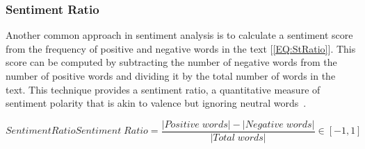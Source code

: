 \subsubsection{Sentiment Ratio}

Another common approach in sentiment analysis is to calculate a sentiment score from the frequency of positive and negative words in the text [\ref{EQ:StRatio}]. This score can be computed by subtracting the number of negative words from the number of positive words and dividing it by the total number of words in the text. This technique provides a sentiment ratio, a quantitative measure of sentiment polarity that is akin to valence but ignoring neutral words~\cite{STSC}.

\begin{equation}[EQ:StRatio]{Sentiment Ratio}
    Sentiment\;Ratio = \frac{|Positive\;words| - |Negative\;words|}{|Total\;words|} \in [-1, 1]
\end{equation}